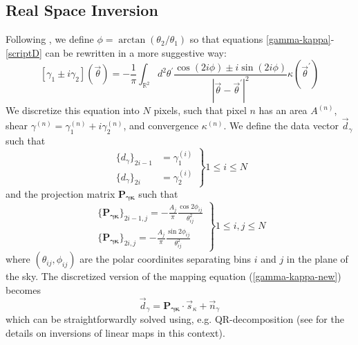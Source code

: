 \documentclass[12pt,preprint]{aastex}			%
\begin{document}
\subsection{Real Space Inversion}
Following \citet{Hu02}, we define $\phi = \arctan (\theta_2/\theta_1)$ so that equations \ref{gamma-kappa}-\ref{scriptD} can be rewritten in a more suggestive way:
\begin{equation}
  \label{gamma-kappa-new}
  [\gamma_1 \pm i\gamma_2](\vec{\theta}) = -\frac{1}{\pi}\int_{\mathbb{R}^2} d^2\theta^\prime\frac{\cos(2i\phi) \pm i\sin(2i\phi)}{|\vec{\theta}-\vec{\theta}^\prime|^2}\kappa(\vec{\theta}^\prime)
\end{equation}
We discretize this equation into $N$ pixels, such that pixel $n$ has an area $A^{(n)}$, shear $\gamma^{(n)} = \gamma_1^{(n)} + i\gamma_2^{(n)}$, and convergence $\kappa^{(n)}$.  We define the data vector $\vec{d}_\gamma$ such that
\begin{equation}
  \left.
  \begin{array}{ll}
    \{d_\gamma\}_{2i-1} &= \gamma_1^{(i)}\\  
    \{d_\gamma\}_{2i}   &= \gamma_2^{(i)}
  \end{array}
  \right\}1\le i\le N
\end{equation}
and the projection matrix $\mathbf{P_{\gamma\kappa}}$ such that
\begin{equation}
  \label{P-gamma-kappa}
  \left.
  \begin{array}{ll}
    \{\mathbf{P_{\gamma\kappa}}\}_{2i-1,j} = -\frac{A_j}{\pi}\frac{\cos{2\phi_{ij}}}{\theta_{ij}^2}\\
    \{\mathbf{P_{\gamma\kappa}}\}_{2i,j} = -\frac{A_j}{\pi}\frac{\sin{2\phi_{ij}}}{\theta_{ij}^2}
  \end{array}
  \right\}1\le i,j\le N
\end{equation}
where $(\theta_{ij},\phi_{ij})$ are the polar coordinites separating bins $i$ and $j$ in the plane of the sky.  The discretized version of the mapping equation (\ref{gamma-kappa-new}) becomes
\begin{equation}
  \label{mapping-gamma-kappa}
  \vec{d}_\gamma = \mathbf{P_{\gamma\kappa}}\cdot\vec{s}_\kappa + \vec{n}_\gamma
\end{equation}
which can be straightforwardly solved using, e.g. QR-decomposition (see \citet{Hu02} for the details on inversions of linear maps in this context).
\end{document}
